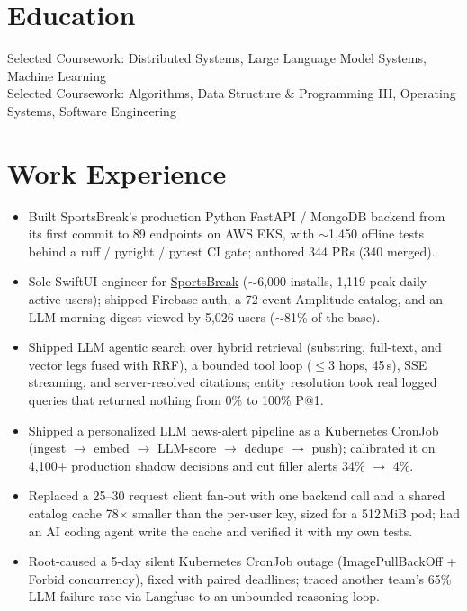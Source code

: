 \documentclass[11pt, letterpaper]{article}
\begin{document}

\section{Education}
Selected Coursework: Distributed Systems, Large Language Model Systems, Machine Learning\\[1pt]
Selected Coursework: Algorithms, Data Structure \& Programming III, Operating Systems, Software Engineering

\section{Work Experience}
\begin{itemize}
  \item Built SportsBreak's production Python FastAPI / MongoDB backend from its first commit to 89 endpoints on AWS EKS, with $\sim$1{,}450 offline tests behind a ruff / pyright / pytest CI gate; authored 344 PRs (340 merged).
  \item Sole SwiftUI engineer for \href{https://apps.apple.com/app/id6762649287}{SportsBreak} ($\sim$6{,}000 installs, 1{,}119 peak daily active users); shipped Firebase auth, a 72-event Amplitude catalog, and an LLM morning digest viewed by 5{,}026 users ($\sim$81\% of the base).
  \item Shipped LLM agentic search over hybrid retrieval (substring, full-text, and vector legs fused with RRF), a bounded tool loop ($\le$3 hops, 45\,s), SSE streaming, and server-resolved citations; entity resolution took real logged queries that returned nothing from 0\% to 100\% P@1.
  \item Shipped a personalized LLM news-alert pipeline as a Kubernetes CronJob (ingest $\to$ embed $\to$ LLM-score $\to$ dedupe $\to$ push); calibrated it on 4{,}100+ production shadow decisions and cut filler alerts 34\% $\to$ 4\%.
  \item Replaced a 25--30 request client fan-out with one backend call and a shared catalog cache 78$\times$ smaller than the per-user key, sized for a 512\,MiB pod; had an AI coding agent write the cache and verified it with my own tests.
  \item Root-caused a 5-day silent Kubernetes CronJob outage (ImagePullBackOff + Forbid concurrency), fixed with paired deadlines; traced another team's 65\% LLM failure rate via Langfuse to an unbounded reasoning loop.
\end{itemize}
\end{document}
